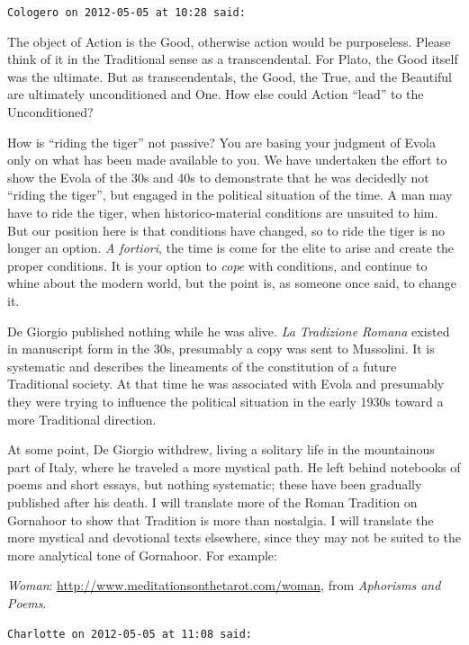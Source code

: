 \begin{footnotesize}
\begin{sffamily}
\hfill

\texttt{Cologero on 2012-05-05 at 10:28 said:}

The object of Action is the Good, otherwise action would be purposeless. Please think of it in the Traditional sense as a transcendental. For Plato, the Good itself was the ultimate. But as transcendentals, the Good, the True, and the Beautiful are ultimately unconditioned and One. How else could Action ``lead'' to the Unconditioned?

How is ``riding the tiger'' not passive? You are basing your judgment of Evola only on what has been made available to you. We have undertaken the effort to show the Evola of the 30s and 40s to demonstrate that he was decidedly not ``riding the tiger'', but engaged in the political situation of the time. A man may have to ride the tiger, when historico-material conditions are unsuited to him. But our position here is that conditions have changed, so to ride the tiger is no longer an option. \emph{A fortiori}, the time is come for the elite to arise and create the proper conditions. It is your option to \emph{cope} with conditions, and continue to whine about the modern world, but the point is, as someone once said, to change it.

De Giorgio published nothing while he was alive. \textit{La Tradizione Romana} existed in manuscript form in the 30s, presumably a copy was sent to Mussolini. It is systematic and describes the lineaments of the constitution of a future Traditional society. At that time he was associated with Evola and presumably they were trying to influence the political situation in the early 1930s toward a more Traditional direction.

At some point, De Giorgio withdrew, living a solitary life in the mountainous part of Italy, where he traveled a more mystical path. He left behind notebooks of poems and short essays, but nothing systematic; these have been gradually published after his death. I will translate more of the Roman Tradition on Gornahoor to show that Tradition is more than nostalgia. I will translate the more mystical and devotional texts elsewhere, since they may not be suited to the more analytical tone of Gornahoor. For example:

\textit{Woman}: \url{http://www.meditationsonthetarot.com/woman}, from \textit{Aphorisms and Poems}.

\hfill

\texttt{Charlotte on 2012-05-05 at 11:08 said:}


\end{sffamily}
\end{footnotesize}
